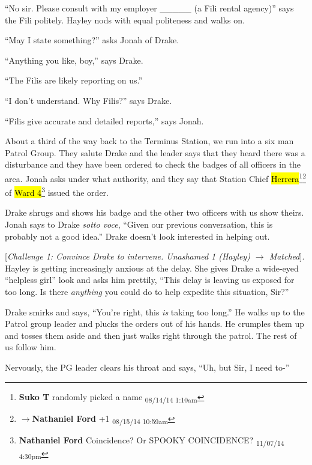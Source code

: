 ``No sir.  Please consult with my employer \_\_\_\_\_ (a Fili rental agency)'' says the Fili politely.  Hayley nods with equal politeness and walks on.

``May I state something?'' asks Jonah of Drake.

``Anything you like, boy,'' says Drake.

``The Filis are likely reporting on us.''

``I don't understand.  Why Filis?'' says Drake.

``Filis give accurate and detailed reports,'' says Jonah.



About a third of the way back to the Terminus Station, we run into a six man Patrol Group.  They salute Drake and the leader says that they heard there was a disturbance and they have been ordered to check the badges of all officers in the area.   Jonah asks under what authority, and they say that Station Chief \hl{Herrera}\footnote{\textbf{Suko T }randomly picked a name \textsubscript{08/14/14 1:10am}}\footnote{$\rightarrow$\textbf{Nathaniel Ford }+1 \textsubscript{08/15/14 10:59am}} of \hl{Ward 4}\footnote{\textbf{Nathaniel Ford }Coincidence? Or SPOOKY COINCIDENCE? \textsubscript{11/07/14 4:30pm}} issued the order.



Drake shrugs and shows his badge and the other two officers with us show theirs.  Jonah says to Drake \textit{sotto voce}, ``Given our previous conversation, this is probably not a good idea.''  Drake doesn't look interested in helping out.  



{[}\textit{Challenge 1: Convince Drake to intervene.  Unashamed 1 (Hayley) $\rightarrow$ Matched}{]}.  Hayley is getting increasingly anxious at the delay.  She gives Drake a wide-eyed ``helpless girl'' look and asks him prettily, ``This delay is leaving us exposed for too long.  Is there \textit{anything} you could do to help expedite this situation, Sir?''



Drake smirks and says, ``You're right, this \textit{is} taking too long.''  He walks up to the Patrol group leader and plucks the orders out of his hands.  He crumples them up and tosses them aside and then just walks right through the patrol.  The rest of us follow him. 



Nervously, the PG leader clears his throat and says, ``Uh, but Sir, I need to-''

